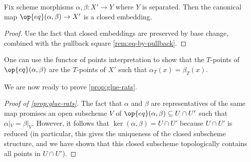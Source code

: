 \documentclass[../notes.tex]{subfiles}
\begin{document}
\begin{lemma}
	Fix scheme morphisms $\alpha,\beta\colon X'\to Y$ where $Y$ is separated. Then the canonical map $\op{eq}(\alpha,\beta)\to X'$ is a closed embedding.
\end{lemma}
\begin{proof}
	Use the fact that closed embeddings are preserved by base change, combined with the pullback square \autoref{rem:eq-by-pullback}.
\end{proof}
\begin{remark}
	One can use the functor of points interpretation to show that the $T$-points of $\op{eq}(\alpha,\beta)$ are the $T$-points of $X'$ such that $\alpha_T(x)=\beta_T(x)$.
\end{remark}
We are now ready to prove \autoref{prop:glue-rats}.
\begin{proof}[Proof of \autoref{prop:glue-rats}]
	The fact that $\alpha$ and $\beta$ are representatives of the same map promises an open subscheme $V$ of $\op{eq}(\alpha,\beta)\subseteq U\cap U'$ such that $\alpha|_V=\beta|_V$. However, it follows that $\ker(\alpha,\beta)=U\cap U'$ because $U\cap U'$ is reduced (in particular, this gives the uniqueness of the closed subscheme structure, and we have shown that this closed subscheme topologically contains all points in $U\cap U'$).
\end{proof}
\end{document}
